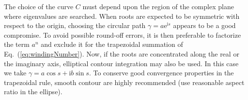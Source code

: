 \documentclass[a4paper,10pt]{article}
\renewcommand{\i}{\mathrm{i}}
\begin{document}
The choice of the curve $C$ must depend upon the region of the complex plane where
eigenvalues are searched. When roots are expected to be symmetric
with respect to the origin, choosing the circular path $\gamma=a \mathrm{e}^{\i s}$
appears to be a good compromise.
To avoid possible round-off errors, it is then preferable to factorize the
term $a^n$ and exclude it for the trapezoidal summation of Eq.~(\ref{eq:windingNumber}).
Now, if the roots are concentrated along the real or the imaginary axis, elliptical contour integration may also be used. In this case we take $\gamma= a \cos s + \i b \sin s$. To conserve good convergence properties in the trapezoidal rule, smooth contour are highly recommended (use reasonable aspect ratio in the ellipse).



%
\end{document}
